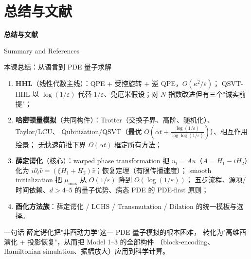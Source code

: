 \documentclass[aspectratio=169,9pt]{ctexbeamer}
\newcommand{\eps}{\varepsilon}
\begin{document}
\section{总结与文献}
\begin{frame}[plain]
\centering\vspace{2.0cm}
{\Huge\bfseries\color{navy} 总结与文献}\par\vspace{4mm}
{\large Summary and References}
\end{frame}

\begin{frame}{本课总结：从语言到 PDE 量子求解}
\begin{enumerate}
\item \textbf{HHL}（线性代数主线）：QPE + 受控旋转 + 逆 QPE，$O(\kappa^2/\eps)$；
QSVT-HHL 以 $\log(1/\eps)$ 代替 $1/\eps$、免厄米假设；对 $N$ 指数改进但有三个"诚实前提"；
\item \textbf{哈密顿量模拟}（共同构件）：Trotter（交换子界、高阶、随机化）、Taylor/LCU、
Qubitization/QSVT（最优 $O(\alpha t+\frac{\log(1/\eps)}{\log\log(1/\eps)})$）、相互作用绘景；
无快速前推下界 $\Omega(\alpha t)$ 框定所有方法；
\item \textbf{薛定谔化}（核心）：warped phase transformation 把 $u_t=Au$（$A=H_1-iH_2$）化为
$i\partial_t\hat v=(\xi H_1+H_2)\hat v$；恢复定理（有限传播速度）；
smooth initialization 把 $\mu_{\max}$ 从 $O(1/\eps)$ 降到 $O(\log(1/\eps))$；
五步流程、源项/时间依赖、$d>4\text{--}5$ 的量子优势、病态 PDE 的 PDE-first 原则；
\item \textbf{酉化方法族}：薛定谔化 / LCHS / Transmutation / Dilation 的统一模板与选择。
\end{enumerate}
\begin{keybox}{一句话}
薛定谔化把"非酉动力学"这一 PDE 量子模拟的根本困难，
转化为"高维酉演化 + 投影恢复"，从而把 Model 1--3 的全部构件
（block-encoding、Hamiltonian simulation、振幅放大）应用到科学计算。
\end{keybox}
\end{frame}
\end{document}
